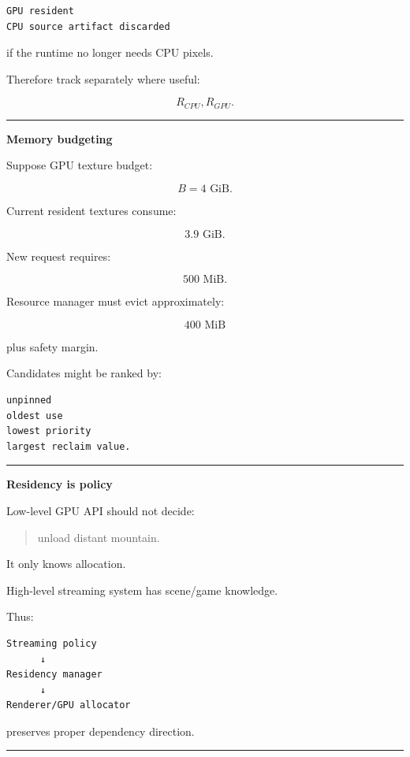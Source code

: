 \begin{verbatim}
GPU resident
CPU source artifact discarded
\end{verbatim}

if the runtime no longer needs CPU pixels.

Therefore track separately where useful:

\[
R_{CPU},
R_{GPU}.
\]

\begin{center}\rule{0.5\linewidth}{0.5pt}\end{center}

\textbf{Memory budgeting}

Suppose GPU texture budget:

\[
B=4\text{ GiB}.
\]

Current resident textures consume:

\[
3.9\text{ GiB}.
\]

New request requires:

\[
500\text{ MiB}.
\]

Resource manager must evict approximately:

\[
400\text{ MiB}
\]

plus safety margin.

Candidates might be ranked by:

\begin{verbatim}
unpinned
oldest use
lowest priority
largest reclaim value.
\end{verbatim}

\begin{center}\rule{0.5\linewidth}{0.5pt}\end{center}

\textbf{Residency is policy}

Low-level GPU API should not decide:

\begin{quote}
unload distant mountain.
\end{quote}

It only knows allocation.

High-level streaming system has scene/game knowledge.

Thus:

\begin{verbatim}
Streaming policy
      ↓
Residency manager
      ↓
Renderer/GPU allocator
\end{verbatim}

preserves proper dependency direction.

\begin{center}\rule{0.5\linewidth}{0.5pt}\end{center}

